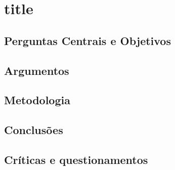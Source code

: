 \documentclass[./../main.tex]{subfiles}
\begin{document}
\setcounter{secnumdepth}{1}

\frenchspacing
\onehalfspacing

\setlength{\parindent}{1em} %
\setlength{\parskip}{1em} %

\section{title}

\subsection{Perguntas Centrais e Objetivos}

\subsection{Argumentos}

\subsection{Metodologia}

\subsection{Conclusões}

\subsection{Críticas e questionamentos}
\end{document}
